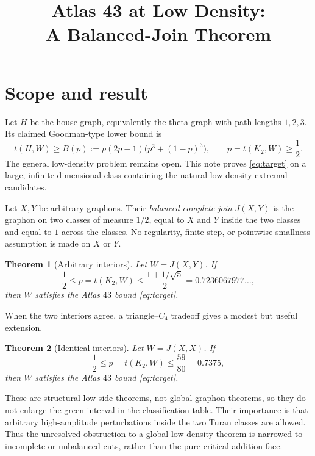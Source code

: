 \documentclass[11pt]{article}
\title{Atlas 43 at Low Density:\\A Balanced-Join Theorem}
\author{}
\date{}
\newtheorem{theorem}{Theorem}
\begin{document}
\maketitle

\section{Scope and result}

Let \(H\) be the house graph, equivalently the theta graph with path
lengths \(1,2,3\).  Its claimed Goodman-type lower bound is
\begin{equation}\label{eq:target}
 t(H,W)\geq B(p):=p(2p-1)\bigl(p^3+(1-p)^3\bigr),
 \qquad p=t(K_2,W)\geq\frac12.
\end{equation}
The general low-density problem remains open.  This note proves
\eqref{eq:target} on a large, infinite-dimensional class containing the
natural low-density extremal candidates.

Let \(X,Y\) be arbitrary graphons.  Their \emph{balanced complete join}
\(J(X,Y)\) is the graphon on two classes of measure \(1/2\), equal to \(X\)
and \(Y\) inside the two classes and equal to \(1\) across the classes.
No regularity, finite-step, or pointwise-smallness assumption is made on
\(X\) or \(Y\).

\begin{theorem}[Arbitrary interiors]\label{thm:arbitrary}
Let \(W=J(X,Y)\).  If
\[
 \frac12\leq p=t(K_2,W)
 \leq \frac{1+1/\sqrt5}{2}=0.7236067977\ldots,
\]
then \(W\) satisfies the Atlas \(43\) bound \eqref{eq:target}.
\end{theorem}

When the two interiors agree, a triangle--\(C_4\) tradeoff gives a modest
but useful extension.

\begin{theorem}[Identical interiors]\label{thm:symmetric}
Let \(W=J(X,X)\).  If
\[
 \frac12\leq p=t(K_2,W)\leq\frac{59}{80}=0.7375,
\]
then \(W\) satisfies the Atlas \(43\) bound \eqref{eq:target}.
\end{theorem}

These are structural low-side theorems, not global graphon theorems, so
they do not enlarge the green interval in the classification table.  Their
importance is that arbitrary high-amplitude perturbations inside the two
Turan classes are allowed.  Thus the unresolved obstruction to a global
low-density theorem is narrowed to incomplete or unbalanced cuts, rather
than the pure critical-addition face.
\end{document}

